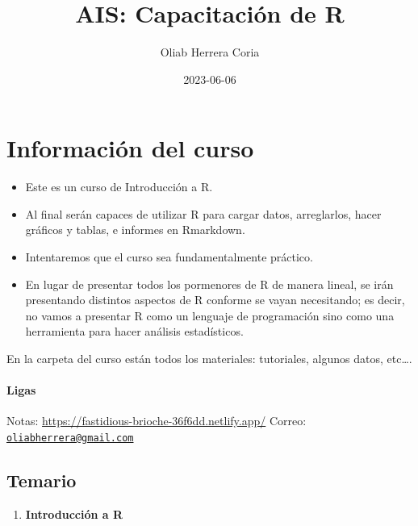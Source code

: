 \documentclass[
]{book}
\title{AIS: Capacitación de R}
\author{Oliab Herrera Coria}
\date{2023-06-06}
\providecommand{\tightlist}{%
  \setlength{\itemsep}{0pt}\setlength{\parskip}{0pt}}
\begin{document}
\maketitle

{
\setcounter{tocdepth}{1}
\tableofcontents
}
\hypertarget{informaciuxf3n-del-curso}{%
\chapter*{Información del curso}\label{informaciuxf3n-del-curso}}

\begin{itemize}
\item
  Este es un curso de Introducción a R.
\item
  Al final serán capaces de utilizar R para cargar datos, arreglarlos, hacer gráficos y tablas, e informes en Rmarkdown.
\item
  Intentaremos que el curso sea fundamentalmente práctico.
\item
  En lugar de presentar todos los pormenores de R de manera lineal, se irán presentando distintos aspectos de R conforme se vayan necesitando; es decir, no vamos a presentar R como un lenguaje de programación sino como una herramienta para hacer análisis estadísticos.
\end{itemize}

En la carpeta del curso están todos los materiales: tutoriales, algunos datos, etc\ldots.

\hypertarget{ligas}{%
\subsubsection*{Ligas}\label{ligas}}

Notas: \url{https://fastidious-brioche-36f6dd.netlify.app/}
Correo: \href{mailto:oliabherrera@gmail.com}{\nolinkurl{oliabherrera@gmail.com}}

\hypertarget{temario}{%
\section*{Temario}\label{temario}}

\begin{enumerate}
\def\labelenumi{\arabic{enumi}.}
\tightlist
\item
  \textbf{Introducción a R}
\end{enumerate}
\end{document}
